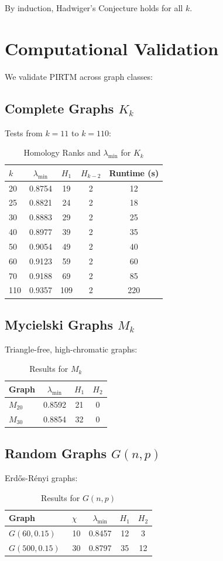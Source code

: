 \documentclass[11pt]{article}
\theoremstyle{plain}
\begin{document}
By induction, Hadwiger’s Conjecture holds for all $k$.

\section{Computational Validation}
We validate PIRTM across graph classes:
\subsection{Complete Graphs \( K_k \)}
Tests from \( k = 11 \) to \( k = 110 \):
\begin{table}[h]
\caption{Homology Ranks and \( \lambda_{\text{min}} \) for \( K_k \)}
\begin{tabular}{lcccc}
\toprule
\( k \) & \( \lambda_{\text{min}} \) & \( H_1 \) & \( H_{k-2} \) & Runtime (s) \\
\midrule
20 & 0.8754 & 19 & 2 & 12 \\
25 & 0.8821 & 24 & 2 & 18 \\
30 & 0.8883 & 29 & 2 & 25 \\
40 & 0.8977 & 39 & 2 & 35 \\
50 & 0.9054 & 49 & 2 & 40 \\
60 & 0.9123 & 59 & 2 & 60 \\
70 & 0.9188 & 69 & 2 & 85 \\
110 & 0.9357 & 109 & 2 & 220 \\
\bottomrule
\end{tabular}
\end{table}
\subsection{Mycielski Graphs \( M_k \)}
Triangle-free, high-chromatic graphs:
\begin{table}[h]
\caption{Results for \( M_k \)}
\begin{tabular}{lccc}
\toprule
Graph & \( \lambda_{\text{min}} \) & \( H_1 \) & \( H_2 \) \\
\midrule
\( M_{20} \) & 0.8592 & 21 & 0 \\
\( M_{30} \) & 0.8854 & 32 & 0 \\
\bottomrule
\end{tabular}
\end{table}
\subsection{Random Graphs \( G(n, p) \)}
Erdős-Rényi graphs:
\begin{table}[h]
\caption{Results for \( G(n, p) \)}
\begin{tabular}{lcccc}
\toprule
Graph & \( \chi \) & \( \lambda_{\text{min}} \) & \( H_1 \) & \( H_2 \) \\
\midrule
\( G(60, 0.15) \) & ~10 & 0.8457 & 12 & 3 \\
\( G(500, 0.15) \) & ~30 & 0.8797 & 35 & 12 \\
\bottomrule
\end{tabular}
\end{table}
\end{document}
